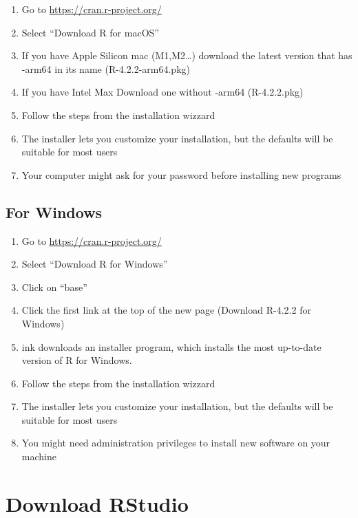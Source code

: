 \documentclass[
  letterpaper,
]{book}
\providecommand{\tightlist}{%
  \setlength{\itemsep}{0pt}\setlength{\parskip}{0pt}}\usepackage{longtable,booktabs,array}
\begin{document}
\begin{enumerate}
\def\labelenumi{\arabic{enumi}.}
\tightlist
\item
  Go to \url{https://cran.r-project.org/}
\item
  Select ``Download R for macOS''
\item
  If you have Apple Silicon mac (M1,M2\ldots) download the latest
  version that has -arm64 in its name (R-4.2.2-arm64.pkg)
\item
  If you have Intel Max Download one without -arm64 (R-4.2.2.pkg)
\item
  Follow the steps from the installation wizzard
\item
  The installer lets you customize your installation, but the defaults
  will be suitable for most users
\item
  Your computer might ask for your password before installing new
  programs
\end{enumerate}

\hypertarget{for-windows}{%
\subsection{For Windows}\label{for-windows}}

\begin{enumerate}
\def\labelenumi{\arabic{enumi}.}
\tightlist
\item
  Go to \url{https://cran.r-project.org/}
\item
  Select ``Download R for Windows''
\item
  Click on ``base''
\item
  Click the first link at the top of the new page (Download R-4.2.2 for
  Windows)
\item
  ink downloads an installer program, which installs the most up-to-date
  version of R for Windows.
\item
  Follow the steps from the installation wizzard
\item
  The installer lets you customize your installation, but the defaults
  will be suitable for most users
\item
  You might need administration privileges to install new software on
  your machine
\end{enumerate}

\hypertarget{download-rstudio}{%
\section{Download RStudio}\label{download-rstudio}}
\end{document}
